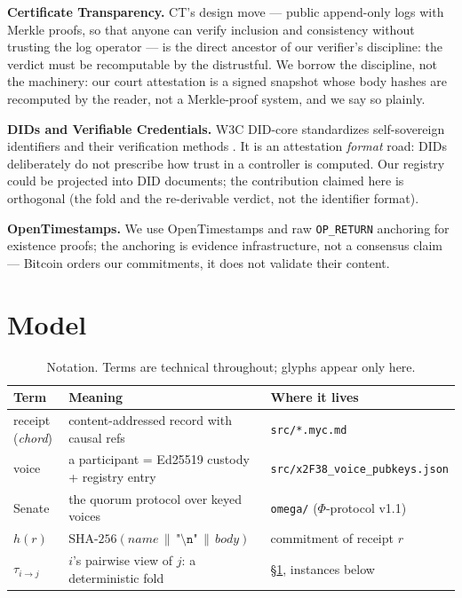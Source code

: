 \documentclass[10pt]{article}
\newcommand{\code}[1]{\texttt{\small #1}}
\newcommand{\repopath}[1]{\texttt{\small #1}}
\begin{document}
\textbf{Certificate Transparency.} CT's design move --- public append-only
logs with Merkle proofs, so that anyone can verify inclusion and consistency
without trusting the log operator \cite{ct-rfc6962} --- is the direct
ancestor of our verifier's discipline: the verdict must be recomputable by
the distrustful. We borrow the discipline, not the machinery: our court
attestation is a signed snapshot whose body hashes are recomputed by the
reader, not a Merkle-proof system, and we say so plainly.

\textbf{DIDs and Verifiable Credentials.} W3C DID-core standardizes
self-sovereign identifiers and their verification methods \cite{did-core}.
It is an attestation \emph{format} road: DIDs deliberately do not prescribe
how trust in a controller is computed. Our registry could be projected into
DID documents; the contribution claimed here is orthogonal (the fold and the
re-derivable verdict, not the identifier format).

\textbf{OpenTimestamps.} We use OpenTimestamps \cite{opentimestamps} and raw
\code{OP\_RETURN} anchoring for existence proofs; the anchoring is evidence
infrastructure, not a consensus claim --- Bitcoin orders our commitments, it
does not validate their content.

\section{Model}
\label{sec:model}

\begin{table}[t]
\centering\small
\begin{tabular}{@{}lll@{}}
\toprule
Term & Meaning & Where it lives \\
\midrule
receipt (\emph{chord}) & content-addressed record with causal refs & \repopath{src/*.myc.md} \\
voice & a participant = Ed25519 custody + registry entry & \repopath{src/x2F38\_voice\_pubkeys.json} \\
Senate & the quorum protocol over keyed voices & \repopath{omega/} ($\Phi$-protocol v1.1) \\
$h(r)$ & $\mathrm{SHA\mbox{-}256}(\mathit{name} \,\|\, \texttt{"\textbackslash n"} \,\|\, \mathit{body})$ & commitment of receipt $r$ \\
$\tau_{i \to j}$ & $i$'s pairwise view of $j$: a deterministic fold & \S\ref{sec:model}, instances below \\
\bottomrule
\end{tabular}
\caption{Notation. Terms are technical throughout; glyphs appear only here.}
\label{tab:notation}
\end{table}
\end{document}
